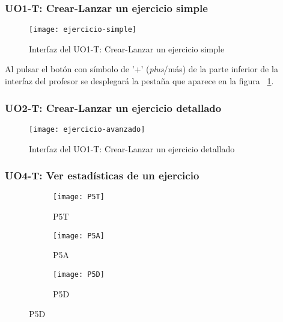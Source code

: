 \subsubsection{UO1-T: Crear-Lanzar un ejercicio simple}
\label{diseno-e-implementacion:interfaces:profesor:uo1-t}

\begin{figure}[H]
	\centering
	\texttt{[image: ejercicio-simple]}
	\caption{Interfaz del UO1-T: Crear-Lanzar un ejercicio simple}
	\label{fig:crear-lanzar-ejercicio-simple}
\end{figure}

Al pulsar el botón con símbolo de '+' (\textit{plus}/más) de la parte inferior de la interfaz del profesor se desplegará la pestaña que aparece en la figura ~\ref{fig:crear-lanzar-ejercicio-simple}.

\subsubsection{UO2-T: Crear-Lanzar un ejercicio detallado}
\label{diseno-e-implementacion:interfaces:profesor:uo2-t}

\begin{figure}[H]
	\centering
	\texttt{[image: ejercicio-avanzado]}
	\caption{Interfaz del UO1-T: Crear-Lanzar un ejercicio detallado}
	\label{fig:crear-lanzar-ejercicio-avanzados}
\end{figure}

\subsubsection{UO4-T: Ver estadísticas de un ejercicio}
\label{diseno-e-implementacion:interfaces:profesor:uo4-t}

\begin{figure}[H]
\begin{subfigure}[b]{0.3\textwidth}
	\centering
	\texttt{[image: P5T]}
	\caption{P5T}
	\label{fig:req-autenticacion:p0}
\end{subfigure}
%
\begin{subfigure}[b]{0.3\textwidth}
	\centering
	\texttt{[image: P5A]}
	\caption{P5A}
	\label{fig:req-autenticacion:p0'}
\end{subfigure}
%
\begin{subfigure}[b]{0.3\textwidth}
	\centering
	\texttt{[image: P5D]}
	\caption{P5D}
	\label{fig:fsm-autenticacion}
\end{subfigure}

\label{fig:autenticacion}
\end{figure}


